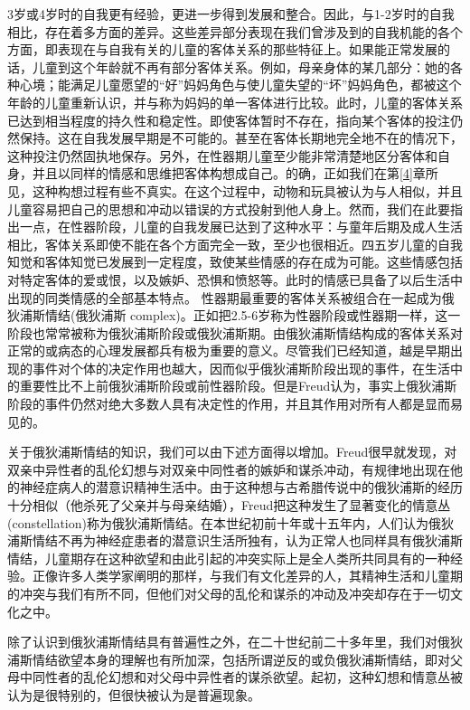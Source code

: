\documentclass[UTF8,10pt,a4paper,openany]{book}
\begin{document}
3岁或4岁时的自我更有经验，更进一步得到发展和整合。因此，与1-2岁时的自我相比，存在着多方面的差异。这些差异部分表现在我们曾涉及到的自我机能的各个方面，即表现在与自我有关的儿童的客体关系的那些特征上。如果能正常发展的话，儿童到这个年龄就不再有部分客体关系。例如，母亲身体的某几部分：她的各种心境；能满足儿童愿望的“好”妈妈角色与使儿童失望的“坏”妈妈角色，都被这个年龄的儿童重新认识，并与称为妈妈的单一客体进行比较。此时，儿童的客体关系已达到相当程度的持久性和稳定性。即使客体暂时不存在，指向某个客体的投注仍然保持。这在自我发展早期是不可能的。甚至在客体长期地完全地不在的情况下，这种投注仍然固执地保存。另外，在性器期儿童至少能非常清楚地区分客体和自身，并且以同样的情感和思维把客体构想成自己。的确，正如我们在第\ref{4}章所见，这种构想过程有些不真实。在这个过程中，动物和玩具被认为与人相似，并且儿童容易把自己的思想和冲动以错误的方式投射到他人身上。然而，我们在此要指出一点，在性器阶段，儿童的自我发展已达到了这种水平：与童年后期及成人生活相比，客体关系即使不能在各个方面完全一致，至少也很相近。四五岁儿童的自我知觉和客体知觉已发展到一定程度，致使某些情感的存在成为可能。这些情感包括对特定客体的爱或恨，以及嫉妒、恐惧和愤怒等。此时的情感已具备了以后生活中出现的同类情感的全部基本特点。
性器期最重要的客体关系被组合在一起成为俄狄浦斯情结(俄狄浦斯 complex)。正如把2.5-6岁称为性器阶段或性器期一样，这一阶段也常常被称为俄狄浦斯阶段或俄狄浦斯期。由俄狄浦斯情结构成的客体关系对正常的或病态的心理发展都兵有极为重要的意义。尽管我们已经知道，越是早期出现的事件对个体的决定作用也越大，因而似乎俄狄浦斯阶段出现的事件，在生活中的重要性比不上前俄狄浦斯阶段或前性器阶段。但是Freud认为，事实上俄狄浦斯阶段的事件仍然对绝大多数人具有决定性的作用，并且其作用对所有人都是显而易见的。

关于俄狄浦斯情结的知识，我们可以由下述方面得以增加。Freud很早就发现，对双亲中异性者的乱伦幻想与对双亲中同性者的嫉妒和谋杀冲动，有规律地出现在他的神经症病人的潜意识精神生活中。由于这种想与古希腊传说中的俄狄浦斯的经历十分相似（他杀死了父亲并与母亲结婚），Freud把这种发生了显著变化的情意丛(constellation)称为俄狄浦斯情结。在本世纪初前十年或十五年内，人们认为俄狄浦斯情结不再为神经症患者的潜意识生活所独有，认为正常人也同样具有俄狄浦斯情结，儿童期存在这种欲望和由此引起的冲突实际上是全人类所共同具有的一种经验。正像许多人类学家阐明的那样，与我们有文化差异的人，其精神生活和儿童期的冲突与我们有所不同，但他们对父母的乱伦和谋杀的冲动及冲突却存在于一切文化之中。

除了认识到俄狄浦斯情结具有普遍性之外，在二十世纪前二十多年里，我们对俄狄浦斯情结欲望本身的理解也有所加深，包括所谓逆反的或负俄狄浦斯情结，即对父母中同性者的乱伦幻想和对父母中异性者的谋杀欲望。起初，这种幻想和情意丛被认为是很特别的，但很快被认为是普遍现象。
\end{document}
